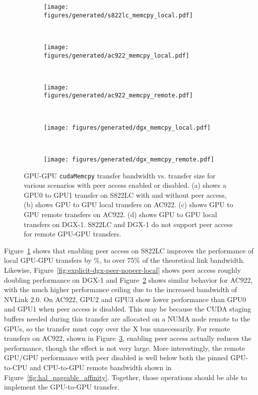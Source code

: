\begin{figure}[H]
	\centering
	\begin{subfigure}[b]{0.3\textwidth}
		\texttt{[image: figures/generated/s822lc\_memcpy\_local.pdf]}
		\caption{}
		\label{fig:explicit-s822lc-peer}
	\end{subfigure}
	~
	\begin{subfigure}[b]{0.3\textwidth}
		\texttt{[image: figures/generated/ac922\_memcpy\_local.pdf]}
		\caption{}
		\label{fig:explicit-hal-peer-local}
	\end{subfigure}
	~
	\begin{subfigure}[b]{0.3\textwidth}
		\texttt{[image: figures/generated/ac922\_memcpy\_remote.pdf]}
		\caption{}
		\label{fig:explicit-hal-peer-remote}
	\end{subfigure}
	\\
	\begin{subfigure}[b]{0.3\textwidth}
		\texttt{[image: figures/generated/dgx\_memcpy\_local.pdf]}
		\caption{}
		\label{fig:explicit-dgx-peer}
	\end{subfigure}
	~
	\begin{subfigure}[b]{0.3\textwidth}
		\texttt{[image: figures/generated/dgx\_memcpy\_remote.pdf]}
		\caption{}
		\label{fig:explicit-dgx-peer}
	\end{subfigure}
	\caption[GPU-GPU \texttt{cudaMemcpy} bandwidth and peer access]{
		GPU-GPU \texttt{cudaMemcpy} transfer bandwidth vs. transfer size for various scenarios with peer access enabled or disabled.
		(a) shows a GPU0 to GPU1 transfer on S822LC with and without peer access,
		(b) shows GPU to GPU local transfers on AC922.
		(c) shows GPU to GPU remote transfers on AC922.
		(d) shows GPU to GPU local transfers on DGX-1.
		S822LC and DGX-1 do not support peer access for remote GPU-GPU transfers.
	}
	\label{fig:explicit-peer}
\end{figure}

Figure~\ref{fig:explicit-s822lc-peer} shows that enabling peer access on S822LC improves the performance of local GPU-GPU transfers by \%, to over 75\% of the theoretical link bandwidth.
Likewise, Figure~\ref{fig:explicit-dgx-peer-nopeer-local} shows peer access roughly doubling performance on DGX-1 and Figure~\ref{fig:explicit-hal-peer-local} shows similar behavior for AC922, with the much higher performance ceiling due to the increased bandwidth of NVLink 2.0.
On AC922, GPU2 and GPU3 show lower performance than GPU0 and GPU1 when peer access is disabled.
This may be because the CUDA staging buffers needed during this transfer are allocated on a NUMA node remote to the GPUs, so the transfer must copy over the X bus unnecessarily.
For remote transfers on AC922, shown in Figure~\ref{fig:explicit-hal-peer-remote}, enabling peer access actually reduces the performance, though the effect is not very large.
More interestingly, the remote GPU/GPU performance with peer disabled is well below both the pinned GPU-to-CPU and CPU-to-GPU remote bandwidth shown in Figure~\ref{fig:hal_pageable_affinity}.
Together, those operations should be able to implement the GPU-to-GPU transfer.

